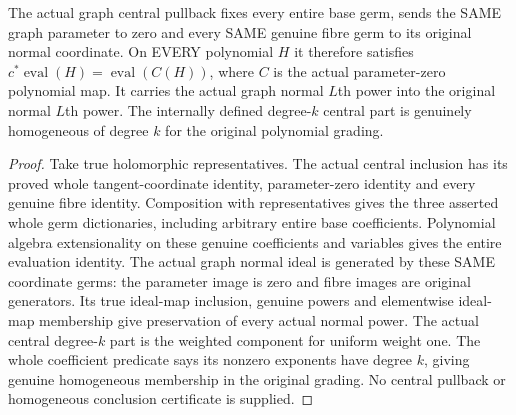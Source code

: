 \begin{lemma}
\label{hir:relative-normal-graph-central-entire-evaluation-dictionary}
\leanok
The actual graph central pullback fixes every entire base germ, sends the SAME graph parameter to zero and every SAME genuine fibre germ to its original normal coordinate. On EVERY polynomial $H$ it therefore satisfies $c^*\operatorname{eval}(H)=\operatorname{eval}(C(H))$, where $C$ is the actual parameter-zero polynomial map. It carries the actual graph normal $L$th power into the original normal $L$th power. The internally defined degree-$k$ central part is genuinely homogeneous of degree $k$ for the original polynomial grading.
\end{lemma}
\begin{proof}
Take true holomorphic representatives. The actual central inclusion has its proved whole tangent-coordinate identity, parameter-zero identity and every genuine fibre identity. Composition with representatives gives the three asserted whole germ dictionaries, including arbitrary entire base coefficients. Polynomial algebra extensionality on these genuine coefficients and variables gives the entire evaluation identity. The actual graph normal ideal is generated by these SAME coordinate germs: the parameter image is zero and fibre images are original generators. Its true ideal-map inclusion, genuine powers and elementwise ideal-map membership give preservation of every actual normal power. The actual central degree-$k$ part is the weighted component for uniform weight one. The whole coefficient predicate says its nonzero exponents have degree $k$, giving genuine homogeneous membership in the original grading. No central pullback or homogeneous conclusion certificate is supplied.
\end{proof}

